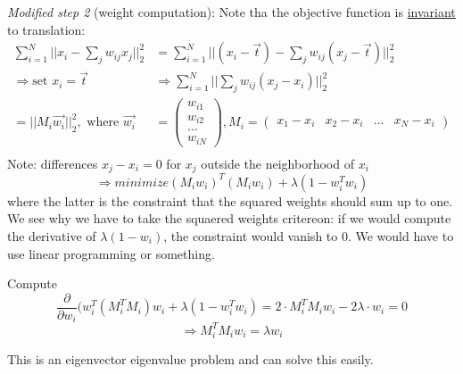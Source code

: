 \bigbreak

\textit{Modified step 2} (weight computation): Note tha the objective function is \underline{invariant} to translation:
\begin{align*}
    \sum_{i=1}^N ||x_i - \sum_j w_{ij} x_j||_2^2 &= \sum_{i=1}^N ||(x_i - \vec{t}) - \sum_j w_{ij} (x_j - \vec{t})||_2^2\\
    \Rightarrow \text{set } x_i = \vec{t} & \Rightarrow
\sum_{i=1}^N ||\sum_j w_{ij} (x_j - x_i)||_2^2\\
    = ||M_i\vec{w_i}||_2^2, \text{ where }
    \vec{w_i} &= \left( \begin{array}{c} w_{i1} \\ w_{i2} \\ \dots \\ w_{iN} \end{array} \right)
   , M_i = \left(\begin{array}{cccc} x_1 - x_i & x_2 - x_i& \dots& x_N - x_i \end{array}\right)\\
\end{align*}
Note: differences \(x_j - x_i = 0\) for \(x_j\) outside the neighborhood of \(x_i\)
\[\Rightarrow minimize (M_i w_i)^T (M_i w_i) + \lambda(1-w_i^T w_i)\]
where the latter is the constraint that the squared weights should sum up to one. We see why we have to take the squaered weights critereon: if we would compute the derivative of \(\lambda(1-w_i)\), the constraint would vanish to \(0\). We would have to use linear programming or something.

Compute
\[\frac{\partial}{\partial w_i} (w_i^T (M_i^T M_i) w_i + \lambda(1-w_i^T w_i)=  2 \cdot M_i^T M_i w_i - 2 \lambda  \cdot w_i = 0\]
\[\Rightarrow M_i^T M_i w_i = \lambda w_i\]

This is an eigenvector eigenvalue problem and can solve this easily.
